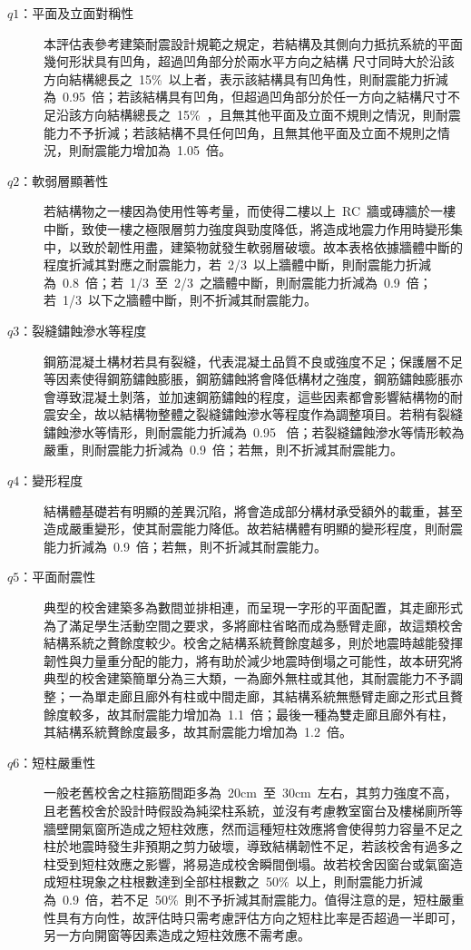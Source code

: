 \begin{description}
  \item[$q1$：平面及立面對稱性]
  本評估表參考建築耐震設計規範之規定，若結構及其側向力抵抗系統的平面幾何形狀具有凹角，超過凹角部分於兩水平方向之結構 尺寸同時大於沿該方向結構總長之~15\%~以上者，表示該結構具有凹角性，則耐震能力折減為~0.95~倍；若該結構具有凹角，但超過凹角部分於任一方向之結構尺寸不足沿該方向結構總長之~15\%~，且無其他平面及立面不規則之情況，則耐震能力不予折減；若該結構不具任何凹角，且無其他平面及立面不規則之情況，則耐震能力增加為~1.05~倍。
  \item[$q2$：軟弱層顯著性]
  若結構物之一樓因為使用性等考量，而使得二樓以上~RC~牆或磚牆於一樓中斷，致使一樓之極限層剪力強度與勁度降低，將造成地震力作用時變形集中，以致於韌性用盡，建築物就發生軟弱層破壞。故本表格依據牆體中斷的程度折減其對應之耐震能力，若~2/3~以上牆體中斷，則耐震能力折減為~0.8~倍；若~1/3~至~2/3~之牆體中斷，則耐震能力折減為~0.9~倍；若~1/3~以下之牆體中斷，則不折減其耐震能力。
  \item[$q3$：裂縫鏽蝕滲水等程度]
  鋼筋混凝土構材若具有裂縫，代表混凝土品質不良或強度不足；保護層不足等因素使得鋼筋鏽蝕膨脹，鋼筋鏽蝕將會降低構材之強度，鋼筋鏽蝕膨脹亦會導致混凝土剝落，並加速鋼筋鏽蝕的程度，這些因素都會影響結構物的耐震安全，故以結構物整體之裂縫鏽蝕滲水等程度作為調整項目。若稍有裂縫鏽蝕滲水等情形，則耐震能力折減為~0.95~ 倍；若裂縫鏽蝕滲水等情形較為嚴重，則耐震能力折減為~0.9~倍；若無，則不折減其耐震能力。
  \item[$q4$：變形程度]
  結構體基礎若有明顯的差異沉陷，將會造成部分構材承受額外的載重，甚至造成嚴重變形，使其耐震能力降低。故若結構體有明顯的變形程度，則耐震能力折減為~0.9~倍；若無，則不折減其耐震能力。
  \item[$q5$：平面耐震性]
  典型的校舍建築多為數間並排相連，而呈現一字形的平面配置，其走廊形式為了滿足學生活動空間之要求，多將廊柱省略而成為懸臂走廊，故這類校舍結構系統之贅餘度較少。校舍之結構系統贅餘度越多，則於地震時越能發揮韌性與力量重分配的能力，將有助於減少地震時倒塌之可能性，故本研究將典型的校舍建築簡單分為三大類，一為廊外無柱或其他，其耐震能力不予調整；一為單走廊且廊外有柱或中間走廊，其結構系統無懸臂走廊之形式且贅餘度較多，故其耐震能力增加為~1.1~倍；最後一種為雙走廊且廊外有柱，其結構系統贅餘度最多，故其耐震能力增加為~1.2~倍。
  \item[$q6$：短柱嚴重性]
  一般老舊校舍之柱箍筋間距多為~20cm~至~30cm~左右，其剪力強度不高，且老舊校舍於設計時假設為純梁柱系統，並沒有考慮教室窗台及樓梯廁所等牆壁開氣窗所造成之短柱效應，然而這種短柱效應將會使得剪力容量不足之柱於地震時發生非預期之剪力破壞，導致結構韌性不足，若該校舍有過多之柱受到短柱效應之影響，將易造成校舍瞬間倒塌。故若校舍因窗台或氣窗造成短柱現象之柱根數達到全部柱根數之~50\%~以上，則耐震能力折減為~0.9~倍，若不足~50\%~則不予折減其耐震能力。值得注意的是，短柱嚴重性具有方向性，故評估時只需考慮評估方向之短柱比率是否超過一半即可，另一方向開窗等因素造成之短柱效應不需考慮。
\end{description}


